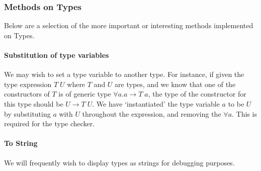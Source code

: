 \subsubsection{Methods on Types}
Below are a selection of the more important or interesting methods implemented on Types.

\paragraph{Substitution of type variables} We may wish to set a type variable to another type. For instance, if given the type expression \(T \; U\) where \(T\) and \(U\) are types, and we know that one of the constructors of \(T\) is of generic type \(\forall a.a \rightarrow T \; a\), the type of the constructor for this type should be \(U \rightarrow T \; U\). We have `instantiated' the type variable \(a\) to be \(U\) by substituting \(a\) with \(U\) throughout the expression, and removing the \(\forall a\). This is required for the type checker. 

\paragraph{To String} We will frequently wish to display types as strings for debugging purposes. 

